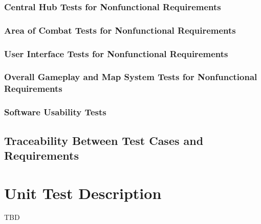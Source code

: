 \documentclass[12pt, titlepage]{article}
\newcounter{SNFT}[subsubsection]
\begin{document}


\subsubsection{Central Hub Tests for Nonfunctional Requirements}



\subsubsection{Area of Combat Tests for Nonfunctional Requirements}



\subsubsection{User Interface Tests for Nonfunctional Requirements}



\subsubsection{Overall Gameplay and Map System Tests for Nonfunctional 
Requirements}


\subsubsection{Software Usability Tests}



\subsection{Traceability Between Test Cases and Requirements}



\section{Unit Test Description}

TBD


\end{document}
